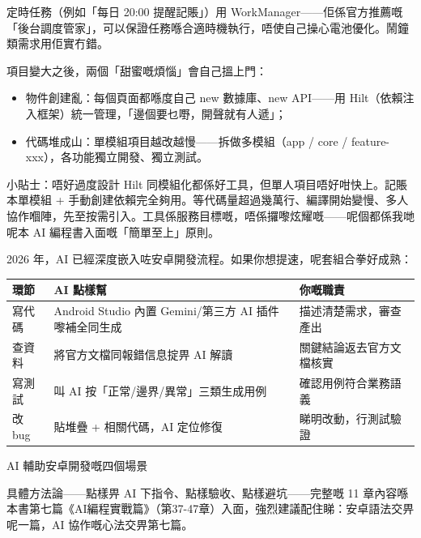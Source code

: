 定時任務（例如「每日 20:00 提醒記賬」）用 WorkManager——佢係官方推薦嘅「後台調度管家」，可以保證任務喺合適時機執行，唔使自己操心電池優化。鬧鐘類需求用佢實冇錯。


項目變大之後，兩個「甜蜜嘅煩惱」會自己搵上門：

\begin{itemize}
  \item 物件創建亂：每個頁面都喺度自己 new 數據庫、new API——用 Hilt（依賴注入框架）統一管理，「邊個要乜嘢，開聲就有人遞」；
  \item 代碼堆成山：單模組項目越改越慢——拆做多模組（app / core / feature-xxx），各功能獨立開發、獨立測試。
\end{itemize}

\begin{tcbinfo}{小貼士：唔好過度設計}
Hilt 同模組化都係好工具，但單人項目唔好咁快上。記賬本單模組 + 手動創建依賴完全夠用。等代碼量超過幾萬行、編譯開始變慢、多人協作嗰陣，先至按需引入。工具係服務目標嘅，唔係攞嚟炫耀嘅——呢個都係我哋呢本 AI 編程書入面嘅「簡單至上」原則。

\end{tcbinfo}


2026 年，AI 已經深度嵌入咗安卓開發流程。如果你想提速，呢套組合拳好成熟：

\begin{center}
\begin{tabularx}{\linewidth}{|X|X|X|}
\hline
\textbf{環節} & \textbf{AI 點樣幫} & \textbf{你嘅職責} \tabularnewline
\hline
寫代碼 & Android Studio 內置 Gemini/第三方 AI 插件嚟補全同生成 & 描述清楚需求，審查產出 \tabularnewline
查資料 & 將官方文檔同報錯信息掟畀 AI 解讀 & 關鍵結論返去官方文檔核實 \tabularnewline
寫測試 & 叫 AI 按「正常/邊界/異常」三類生成用例 & 確認用例符合業務語義 \tabularnewline
改 bug & 貼堆疊 + 相關代碼，AI 定位修復 & 睇明改動，行測試驗證 \tabularnewline
\hline
\end{tabularx}
\end{center}

\begin{center}\small\color{gray}AI 輔助安卓開發嘅四個場景\end{center}

具體方法論——點樣畀 AI 下指令、點樣驗收、點樣避坑——完整嘅 11 章內容喺本書第七篇《AI編程實戰篇》（第37-47章）入面，強烈建議配住睇：安卓語法交畀呢一篇，AI 協作嘅心法交畀第七篇。

